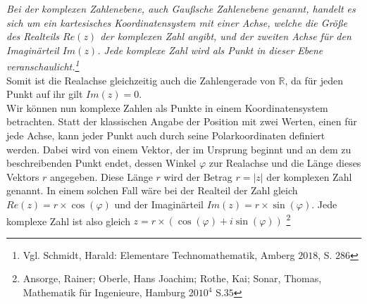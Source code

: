 \documentclass[a4paper,12pt]{article} %
\begin{document}
\emph{Bei der komplexen Zahlenebene, auch Gaußsche Zahlenebene genannt, handelt es sich um ein kartesisches Koordinatensystem mit einer Achse, welche die Größe des Realteils $Re(z)$ der komplexen Zahl angibt, und der zweiten Achse für den Imaginärteil $Im(z)$. Jede komplexe Zahl wird als Punkt in dieser Ebene veranschaulicht.\footnote{Vgl. Schmidt, Harald: Elementare Technomathematik, Amberg $2018$, S. $286$}}\\


Somit ist die Realachse gleichzeitig auch die Zahlengerade von $\mathbb{R}$, da für jeden Punkt auf ihr gilt $Im(z)=0$.\\



Wir können nun komplexe Zahlen als Punkte in einem Koordinatensystem betrachten.
Statt der klassischen Angabe der Position mit zwei Werten, einen für jede Achse, kann jeder Punkt auch durch seine Polarkoordinaten definiert werden.
Dabei wird von einem Vektor, der im Ursprung beginnt und an dem zu beschreibenden Punkt endet, dessen Winkel $\varphi$ zur Realachse und die Länge dieses Vektors $r$ angegeben. Diese Länge $r$ wird der Betrag $r=|z|$ der komplexen Zahl genannt.
In einem solchen Fall wäre bei der Realteil der Zahl gleich $Re(z)=r\times\cos(\varphi)$ und der Imaginärteil $Im(z)=r\times\sin(\varphi)$.
Jede komplexe Zahl ist also gleich $z=r\times(\cos(\varphi)+i\sin(\varphi))$
\footnote{Ansorge, Rainer; Oberle, Hans Joachim; Rothe, Kai; Sonar, Thomas, Mathematik für Ingenieure, Hamburg $2010^4$ S.$35$}
\end{document}
